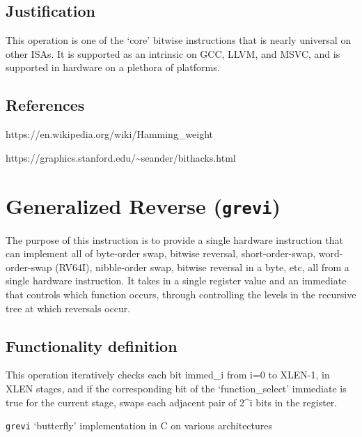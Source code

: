 \subsection{Justification}

This operation is one of the `core' bitwise instructions that is nearly
universal on other ISAs. It is supported as an intrinsic on GCC, LLVM,
and MSVC, and is supported in hardware on a plethora of platforms.

\subsection{References}

https://en.wikipedia.org/wiki/Hamming\_weight

https://graphics.stanford.edu/\textasciitilde{}seander/bithacks.html


\section{Generalized Reverse (\texttt{grevi})}

The purpose of this instruction is to provide a single hardware
instruction that can implement all of byte-order swap, bitwise reversal,
short-order-swap, word-order-swap (RV64I), nibble-order swap, bitwise
reversal in a byte, etc, all from a single hardware instruction. It
takes in a single register value and an immediate that controls which
function occurs, through controlling the levels in the recursive tree at
which reversals occur.

\subsection{Functionality definition}

This operation iteratively checks each bit immed\_i from i=0 to XLEN-1,
in XLEN stages, and if the corresponding bit of the `function\_select'
immediate is true for the current stage, swaps each adjacent pair of
2\^{}i bits in the register.

\texttt{grevi} `butterfly' implementation in C on various architectures

